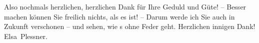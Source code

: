\pstart
           Also nochmals herzlichen, herzlichen Dank für Ihre Geduld und Güte! – Besser machen
               können Sie freilich nichts, als es ist! – Darum werde ich Sie auch in Zukunft
               verschonen – und sehen, wie s ohne Feder geht. Herzlichen innigen Dank!\pend
           \pstart \spacefill\mbox{Elsa Plessner.}\pend{}\endnumbering{}  \newcommand{\dateiname}{L03711}\newcommand{\titel}{Elsa Plessner an Arthur Schnitzler, 9. 1. 1897}\newcommand{\editorInnen}{Selma Jahnke und Martin Anton Müller}
